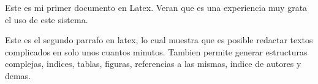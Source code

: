 \documentclass[12pt]{book}
\begin{document}
Este es mi primer documento en Latex. Veran
que es una experiencia muy grata el uso de este
sistema. 

Este es el segundo parrafo en latex, lo cual
muestra que es posible redactar textos complicados
en solo unos cuantos minutos. Tambien permite
generar estructuras complejas, indices, tablas, 
figuras, referencias a las mismas, indice de autores 
y demas.
\end{document}
